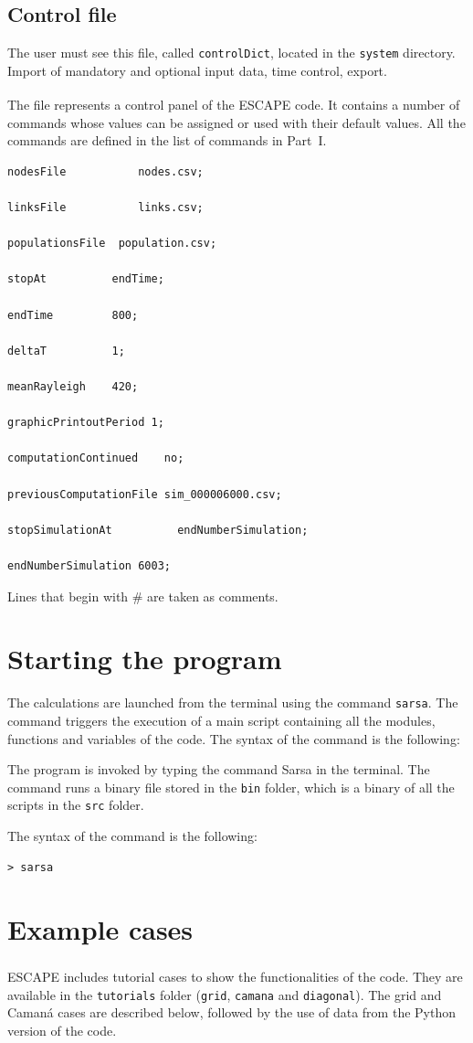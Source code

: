 \documentclass[12pt,a4paper]{book}
\newcommand{\escape}{ESCAPE\textsuperscript{\textregistered}}
\begin{document}
\subsection{Control file}
The user must see this file, called \texttt{controlDict}, located in the \texttt{system} directory.
Import of mandatory and optional input data, time control, export.

The file represents a control panel of the \escape{} code. It contains a number of commands whose
values can be assigned or used with their default values. All the commands are defined in the
list of commands in Part~I.
\begin{lstlisting}[style=control]
nodesFile           nodes.csv;

linksFile           links.csv;

populationsFile  population.csv;

stopAt          endTime;

endTime         800;

deltaT          1;

meanRayleigh    420;

graphicPrintoutPeriod 1;

computationContinued    no;

previousComputationFile sim_000006000.csv;

stopSimulationAt          endNumberSimulation;

endNumberSimulation 6003;
\end{lstlisting}
Lines that begin with \# are taken as comments.

\section{Starting the program}
The calculations are launched from the terminal using the command \texttt{sarsa}. The command
triggers the execution of a main script containing all the modules, functions and variables of the
code. The syntax of the command is the following:

The program is invoked by typing the command Sarsa in the terminal. The command runs a binary file
stored in the \texttt{bin} folder, which is a binary of all the scripts in the \texttt{src} folder.

The syntax of the command is the following:\nopagebreak
\begin{lstlisting}[style=shell]
> sarsa
\end{lstlisting}

\section{Example cases}
\escape{} includes tutorial cases to show the functionalities of the code. They are available in the
\texttt{tutorials} folder (\texttt{grid}, \texttt{camana} and \texttt{diagonal}). The grid and
Camaná cases are described below, followed by the use of data from the Python version of the code.
\end{document}
